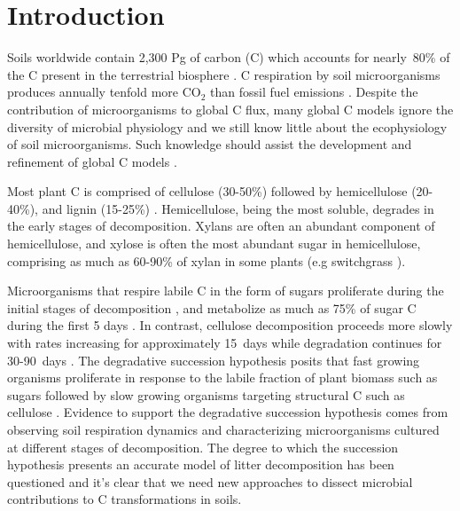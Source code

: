 \section{Introduction}
Soils worldwide contain 2,300 Pg of carbon (C) which accounts for nearly~80\%
of the C present in the terrestrial biosphere
\citep{Amundson_2001,BATJES_1996}. C respiration by soil microorganisms
produces annually tenfold more CO$_{2}$ than fossil fuel emissions
\citep{chapin2002principles}. Despite the contribution of microorganisms to
global C flux, many global C models ignore the diversity of microbial
physiology \citep{Allison2010,Six2006,Treseder2011} and we still know little
about the ecophysiology of soil microorganisms. Such knowledge should
assist the development and refinement of global C models
\citep{Bradford2008,Neff_2001,McGuire2010,Wieder2013}.

Most plant C is comprised of cellulose (30-50\%) followed by hemicellulose
(20-40\%), and lignin (15-25\%) \citep{Lynd2002}. Hemicellulose, being the most
soluble, degrades in the early stages of decomposition. Xylans are often an
abundant component of hemicellulose, and xylose is often the most abundant
sugar in hemicellulose, comprising as much as 60-90\% of xylan in some plants
(e.g  switchgrass \citep{Bunnell2013}). 

Microorganisms that respire labile C in the form of sugars proliferate during
the initial stages of decomposition \citep{Garrett1951,Alexander1964}, and
metabolize as much as 75\% of sugar C during the first 5 days
\citep{Engelking2007}. In contrast, cellulose decomposition proceeds more
slowly with rates increasing for approximately 15~days while degradation
continues for 30-90~days \citep{Hu1997,Engelking2007}. The degradative
succession hypothesis posits that fast growing organisms proliferate in
response to the labile fraction of plant biomass such as sugars
\citep{Garrett1963,Bremer1994} followed by slow growing organisms targeting
structural C such as cellulose \citep{Garrett1963}. Evidence to support the
degradative succession hypothesis comes from observing soil respiration
dynamics and characterizing microorganisms cultured at different stages of
decomposition. The degree to which the succession hypothesis presents an
accurate model of litter decomposition has been questioned
\citep{AnneliseHKjoller2002,Frankland_1998,Osono_2005} and it's clear that we
need new approaches to dissect microbial contributions to C transformations in
soils.

